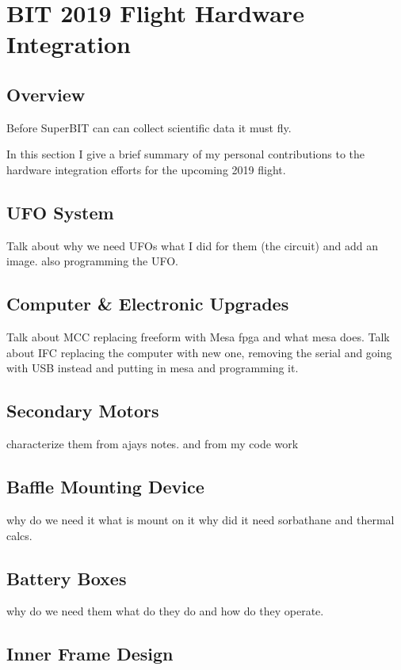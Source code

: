 \chapter{BIT 2019 Flight Hardware Integration}
\section{Overview}
Before SuperBIT can can collect scientific data it must fly. 
\par
In this section I give a brief summary of my personal contributions to the hardware integration efforts for the upcoming 2019 flight. 

\section{UFO System}
Talk about why we need UFOs what I did for them (the circuit) and add an image. also programming the UFO.

\section{Computer \& Electronic Upgrades}
Talk about MCC replacing freeform with Mesa fpga and what mesa does. 
Talk about IFC replacing the computer with new one, removing the serial and going with USB instead and putting in mesa and programming it.

\section{Secondary Motors}
characterize them from ajays notes. and from my code work

\section{Baffle Mounting Device}
why do we need it what is mount on it why did it need sorbathane and thermal calcs.

\section{Battery Boxes}
why do we need them what do they do and how do they operate.

\section{Inner Frame Design}


